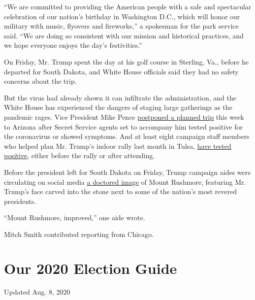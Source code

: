 ``We are committed to providing the American people with a safe and
spectacular celebration of our nation's birthday in Washington D.C.,
which will honor our military with music, flyovers and fireworks,'' a
spokesman for the park service said. ``We are doing so consistent with
our mission and historical practices, and we hope everyone enjoys the
day's festivities.''

On Friday, Mr. Trump spent the day at his golf course in Sterling, Va.,
before he departed for South Dakota, and White House officials said they
had no safety concerns about the trip.

But the virus had already shown it can infiltrate the administration,
and the White House has experienced the dangers of staging large
gatherings as the pandemic rages. Vice President Mike Pence
\href{https://www.nytimes.com/2020/07/02/us/politics/pence-covid.html}{postponed
a planned trip} this week to Arizona after Secret Service agents set to
accompany him tested positive for the coronavirus or showed symptoms.
And at least eight campaign staff members who helped plan Mr. Trump's
indoor rally last month in Tulsa,
\href{https://www.nytimes.com/2020/06/22/us/politics/trump-campaign-coronavirus-tulsa.html}{have
tested positive}, either before the rally or after attending.

Before the president left for South Dakota on Friday, Trump campaign
aides were circulating on social media
\href{https://twitter.com/abigailmarone/status/1279044148184694787}{a
doctored image} of Mount Rushmore, featuring Mr. Trump's face carved
into the stone next to some of the nation's most revered presidents.

``Mount Rushmore, improved,'' one aide wrote.

Mitch Smith contributed reporting from Chicago.

\hypertarget{our-2020-election-guide}{%
\section{Our 2020 Election Guide}\label{our-2020-election-guide}}

Updated Aug. 8, 2020

